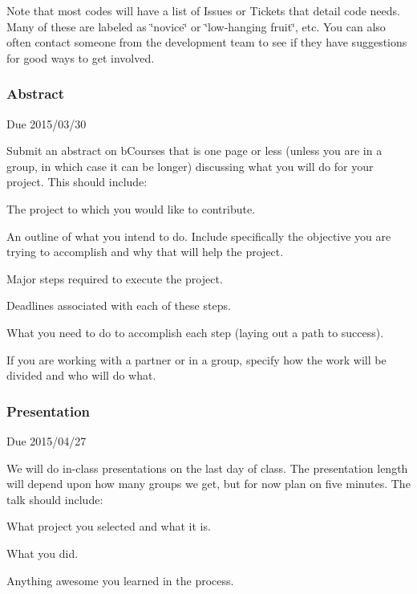 Note that most codes will have a list of Issues or Tickets that detail code needs. Many of these are labeled as \char`\"{}novice\char`\"{} or \char`\"{}low-\/hanging fruit\char`\"{}, etc. You can also often contact someone from the development team to see if they have suggestions for good ways to get involved. 

 \subsubsection*{Abstract}

Due 2015/03/30

Submit an abstract on b\+Courses that is one page or less (unless you are in a group, in which case it can be longer) discussing what you will do for your project. This should include\+:


\begin{DoxyEnumerate}
\item The project to which you would like to contribute.
\item An outline of what you intend to do. Include specifically the objective you are trying to accomplish and why that will help the project.
\item Major steps required to execute the project.
\item Deadlines associated with each of these steps.
\item What you need to do to accomplish each step (laying out a path to success).
\item If you are working with a partner or in a group, specify how the work will be divided and who will do what. 

 \subsubsection*{Presentation}
\end{DoxyEnumerate}

Due 2015/04/27

We will do in-\/class presentations on the last day of class. The presentation length will depend upon how many groups we get, but for now plan on five minutes. The talk should include\+:


\begin{DoxyItemize}
\item What project you selected and what it is.
\item What you did.
\item Anything awesome you learned in the process. 
\end{DoxyItemize}